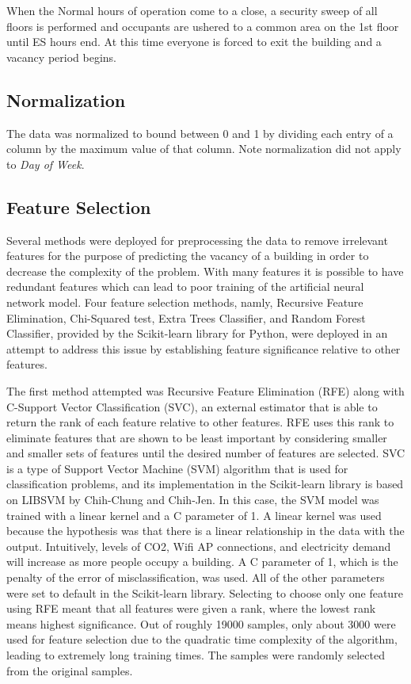 \documentclass[letterpaper, 12 pt, conference]{ieeeconf}  %
\begin{document}
When the Normal hours of operation come to a close, a security sweep of all floors is performed and occupants are ushered to a common area on the 1st floor until ES hours end. At this time everyone is forced to exit the building and a vacancy period begins.

\subsection{Normalization}

The data was normalized to bound between 0 and 1 by dividing each entry of a column by the maximum value of that column. Note normalization did not apply to \textit{Day of Week}.

\subsection{Feature Selection}

Several methods were deployed for preprocessing the data to remove irrelevant features for the purpose of predicting the vacancy of a building in order to decrease the complexity of the problem. With many features it is possible to have redundant features which can lead to poor training of the artificial neural network model. Four feature selection methods, namly, Recursive Feature Elimination, Chi-Squared test, Extra Trees Classifier, and  Random Forest Classifier, provided by the Scikit-learn library for Python, were deployed in an attempt to address this issue by establishing feature significance relative to other features.

The first method attempted was Recursive Feature Elimination (RFE) along with C-Support Vector Classification (SVC), an external estimator that is able to return the rank of each feature relative to other features. RFE uses this rank to eliminate features that are shown to be least important by considering smaller and smaller sets of features until the desired number of features are selected. SVC is a type of Support Vector Machine (SVM) algorithm that is used for classification problems, and its implementation in the Scikit-learn library is based on LIBSVM by Chih-Chung and Chih-Jen. In this case, the SVM model was trained with a linear kernel and a C parameter of 1. A linear kernel was used because the hypothesis was that there is a linear relationship in the data with the output. Intuitively, levels of CO2, Wifi AP connections, and electricity demand will increase as more people occupy a building. A C parameter of 1, which is the penalty of the error of misclassification, was used.  All of the other parameters were set to default in the Scikit-learn library. Selecting to choose only one feature using RFE meant that all features were given a rank, where the lowest rank means highest significance. Out of roughly 19000 samples, only about 3000 were used for feature selection due to the quadratic time complexity of the algorithm, leading to extremely long training times. The samples were randomly selected from the original samples.
        
\end{document}
